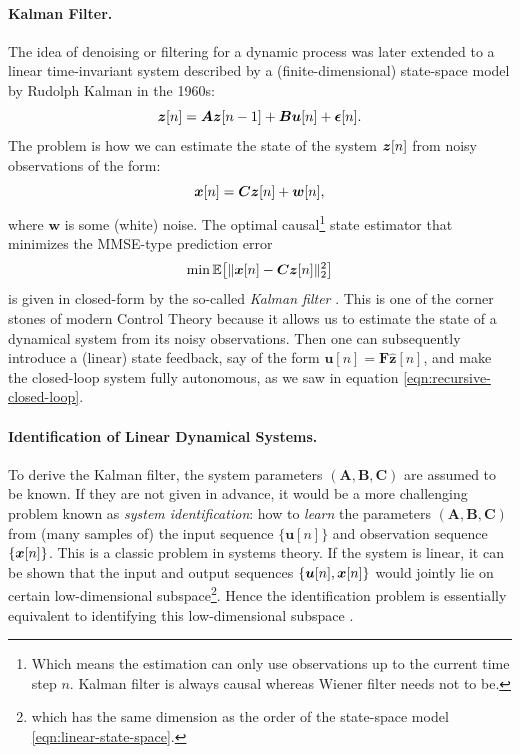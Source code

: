 \documentclass[../../book-main.tex]{subfiles}
\begin{document}
\paragraph{Kalman Filter.} 
The idea of denoising or filtering for a dynamic process was later extended to a linear time-invariant system described by a (finite-dimensional) state-space model by Rudolph Kalman in the 1960s:
\begin{equation}
    \bm{z}[n] = \boldsymbol{A} \bm{z}[n-1] + \boldsymbol{B}\boldsymbol{u}[n] + \boldsymbol{\epsilon}[n]. 
    \label{eqn:linear-state-space}
\end{equation}
The problem is how we can estimate the state of the system $\bm{z}[n]$ from noisy observations of the form: \begin{equation}\bm{x}[n] = \boldsymbol{C} \bm{z}[n] + \boldsymbol{w}[n],
\label{eqn:Kalman-model}
\end{equation}
where $\boldsymbol{w}$ is some (white) noise. The optimal causal\footnote{Which means the estimation can only use observations up to the current  time step $n$. Kalman filter is always causal whereas Wiener filter needs not to be.} state  estimator that minimizes the MMSE-type prediction error
\begin{equation}
    \min \mathbb{E}\big[ \|\bm{x}[n] - \boldsymbol{C}\bm{z}[n]\|_2^2\big]
\end{equation}
is given in closed-form by the so-called {\em Kalman filter} \cite{kalman1960new}. This is one of the corner stones of modern Control Theory because it allows us to estimate the state of a dynamical system from its noisy observations. Then one can subsequently introduce a (linear) state feedback, say of the form $\boldsymbol{u}[n] = \boldsymbol{F} \hat{\boldsymbol{z}}[n]$, and make the closed-loop system fully autonomous, as we saw in equation \eqref{eqn:recursive-closed-loop}. 

\paragraph{Identification of Linear Dynamical Systems.}
To derive the Kalman filter, the system parameters $(\boldsymbol{A}, \boldsymbol{B}, \boldsymbol{C})$ are assumed to be known. If they are not given in advance, it would be a more challenging problem known as {\em system identification}: how to {\em learn} the parameters $(\boldsymbol{A}, \boldsymbol{B}, \boldsymbol{C})$ from (many samples of) the input sequence $\{\boldsymbol{u}[n]\}$ and observation sequence $\{\bm{x}[n]\}$. This is a classic problem in systems theory. If the system is linear, it can be shown that the input and output sequences $\{\boldsymbol{u}[n], \bm{x}[n]\}$ would jointly lie on certain low-dimensional subspace\footnote{which has the same dimension as the order of the state-space model \eqref{eqn:linear-state-space}. }. Hence the identification problem is essentially equivalent to identifying this low-dimensional subspace \cite{OverscheeP1996,Liu-2009-CDC,Liu-2010-SIAM}. 
\end{document}
